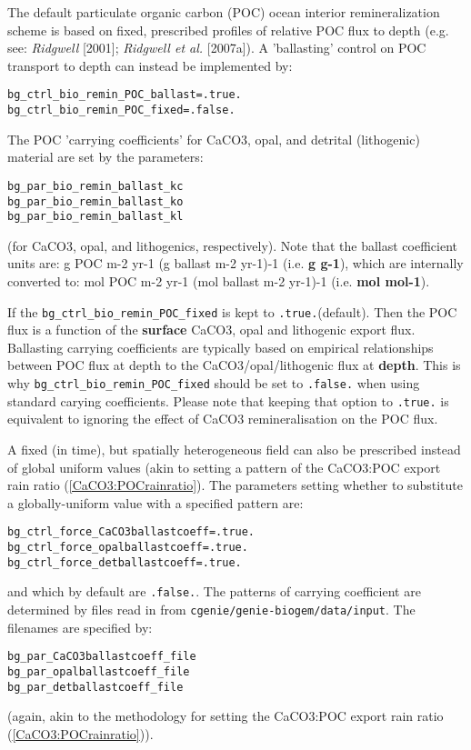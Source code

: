 \documentclass[10pt,twoside]{article}
\begin{document}
The default particulate organic carbon (POC) ocean interior remineralization scheme is based on fixed, prescribed profiles of relative POC flux to depth (e.g. see: \textit{Ridgwell} [2001]; \textit{Ridgwell et al.} [2007a]). A 'ballasting' control on POC transport to depth can instead be implemented by:
\vspace{-5.5pt}\begin{verbatim}
bg_ctrl_bio_remin_POC_ballast=.true.
bg_ctrl_bio_remin_POC_fixed=.false.
\end{verbatim}\vspace{-5.5pt}

The POC 'carrying coefficients' for CaCO3, opal, and detrital (lithogenic) material are set by the parameters:
\vspace{-5.5pt}\begin{verbatim}
bg_par_bio_remin_ballast_kc
bg_par_bio_remin_ballast_ko
bg_par_bio_remin_ballast_kl
\end{verbatim}\vspace{-5.5pt}
(for CaCO3, opal, and lithogenics, respectively). Note that the ballast coefficient units are: g POC m-2 yr-1 (g ballast m-2 yr-1)-1 (i.e. \textbf{g g-1}), which are internally converted to: mol POC m-2 yr-1 (mol ballast m-2 yr-1)-1 (i.e. \textbf{mol mol-1}).

If the \verb=bg_ctrl_bio_remin_POC_fixed= is kept to  \verb=.true.=(default). Then the POC flux is a function of the \textbf{surface} CaCO3, opal and lithogenic export flux. Ballasting carrying coefficients are typically based on empirical relationships between POC flux at depth to the CaCO3/opal/lithogenic flux at \textbf{depth}. This is why \verb=bg_ctrl_bio_remin_POC_fixed= should be set to \verb=.false.= when using standard carying coefficients. Please note that keeping that option to \verb=.true.= is equivalent to ignoring the effect of CaCO3 remineralisation on the POC flux. 

A fixed (in time), but spatially heterogeneous field can also be prescribed instead of global uniform values (akin to setting a pattern of the CaCO3:POC export rain ratio (\ref{CaCO3:POCrainratio}). The parameters setting whether to substitute a globally-uniform value with a specified pattern are:
\vspace{-5.5pt}\begin{verbatim}
bg_ctrl_force_CaCO3ballastcoeff=.true.
bg_ctrl_force_opalballastcoeff=.true.
bg_ctrl_force_detballastcoeff=.true.
\end{verbatim}\vspace{-5.5pt}
and which by default are \texttt{.false.}.
The patterns of carrying coefficient are determined by files read in from \texttt{cgenie\slash genie-biogem\slash data\slash input}. The filenames are specified by:
\vspace{-5.5pt}\begin{verbatim}
bg_par_CaCO3ballastcoeff_file
bg_par_opalballastcoeff_file
bg_par_detballastcoeff_file
\end{verbatim}\vspace{-5.5pt}
(again, akin to the methodology for setting the CaCO3:POC export rain ratio (\ref{CaCO3:POCrainratio})).
\end{document}
